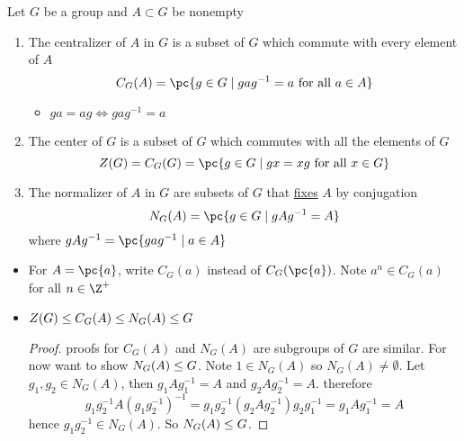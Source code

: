 \documentclass[11pt]{article}
\begin{document}
\section{}


\begin{definition*}
     Let $G$ be a group and $A\subset G$ be nonempty
    \begin{enumerate}
        \item {} The centralizer of $A$ in $G$ is a subset of $G$ which commute with every element of $A$
        \[
            C_G(A) = \pc{
                g\in G \mid gag^{-1} = a \text{ for all }  a\in A
            }    
        \]
        \begin{itemize}
            \item  $ga=ag \iff gag^{-1}=a$
        \end{itemize}
        \item {} The center of $G$ is a subset of $G$ which commutes with all the elements of $G$
        \[
            Z(G) = C_G(G) = \pc{
                g\in G \mid gx = xg \text{ for all } x\in G
            }    
        \]
        \item {} The normalizer of $A$ in $G$ are subsets of $G$ that \underline{fixes} $A$ by conjugation
        \[
            N_G(A) = \pc{
                g\in G \mid gAg^{-1} = A
            }
        \]
        where $gAg^{-1} = \pc{gag^{-1} \mid a\in A}$
    \end{enumerate}
    \begin{itemize}
        \item {} For $A=\pc{a}$, write $C_G(a)$ instead of $C_G(\pc{a})$. Note $a^n \in C_G(a)$ for all $n\in\Z^+$
        \item {} $Z(G) \leq C_G(A) \leq N_G(A) \leq G$
        \begin{proof}
            proofs for $C_G(A)$ and $N_G(A)$ are subgroups of $G$ are similar. For now want to show $N_G(A)\leq G$. Note $1 \in N_G(A)$ so $N_G(A) \neq \emptyset$. Let $g_1,g_2\in N_G(A)$, then $g_1Ag_1^{-1} = A$ and $g_2Ag_2^{-1} = A$. therefore 
            \[
                g_1g_2^{-1} A (g_1 g_2^{-1})^{-1} = g_1g_2^{-1} (g_2 A g_2^{-1}) g_2 g_1^{-1} = g_1 A g_1^{-1} = A  
            \]
            hence $g_1g_2^{-1} \in N_G(A)$. So $N_G(A)\leq G$.
        \end{proof}

\end{itemize}
\end{definition*}
\end{document}
